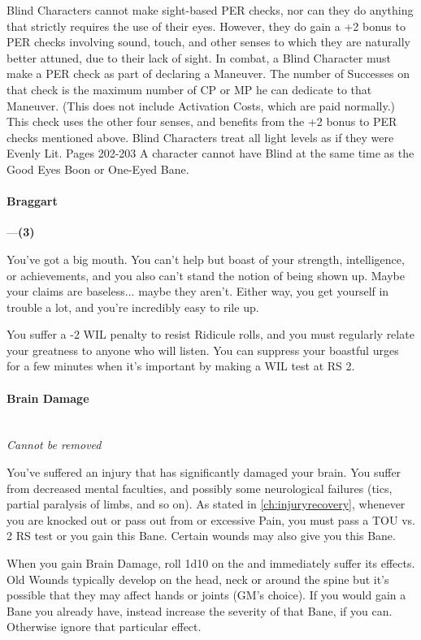 \documentclass[oneside,11pt,english]{book}
\begin{document}
Blind Characters cannot make sight-based PER checks, nor can they do anything that strictly requires the 
use of their eyes. However, they do gain a +2 bonus to PER checks involving sound, touch, and other 
senses to which they are naturally better attuned, due to their lack of sight. In combat, a Blind Character 
must make a PER check as part of declaring a Maneuver. The number of Successes on that check is the 
maximum number of CP or MP he can dedicate to that Maneuver. (This does not include Activation 
Costs, which are paid normally.) 
This check uses the other four senses, and benefits from the +2 bonus to PER checks mentioned above. 
Blind Characters treat all light levels as if they were Evenly Lit. Pages 202-203 
A character cannot have Blind at the same time as the Good Eyes Boon or One-Eyed Bane. 
\paragraph{\label{bane:Braggart}Braggart}---\quad\textbf{(3)}\par
You've got a big mouth. You can't help but boast of your strength, intelligence, or achievements, and you 
also can't stand the notion of being shown up. Maybe your claims are baseless... maybe they aren't. Either 
way, you get yourself in trouble a lot, and you're incredibly easy to rile up. 


You suffer a -2 WIL penalty to resist Ridicule rolls, and you must regularly relate your greatness to 
anyone who will listen. You can suppress your boastful urges for a few minutes when it's important by 
making a WIL test at RS 2. 

 

\paragraph{\label{bane:Brain Damage}Brain Damage}\quad\\
\textit{Cannot be removed}\par
You've suffered an injury that has significantly damaged your brain. You suffer from decreased mental 
faculties, and possibly some neurological failures (tics, partial paralysis of limbs, and so on). As stated in \autoref{ch:injuryrecovery}, whenever you are knocked out or pass out from  or excessive Pain, you must pass a TOU vs. 2 RS test or you gain this Bane. Certain wounds may also give you this Bane. 


When you gain Brain Damage, roll 1d10 on the  and immediately suffer its effects.\\
Old Wounds typically develop on the head, neck or around the spine but it’s possible that they may affect hands or joints (GM’s choice). If you would gain a Bane you already have, instead increase the severity of that Bane, if you can. Otherwise ignore that particular effect.
\end{document}
